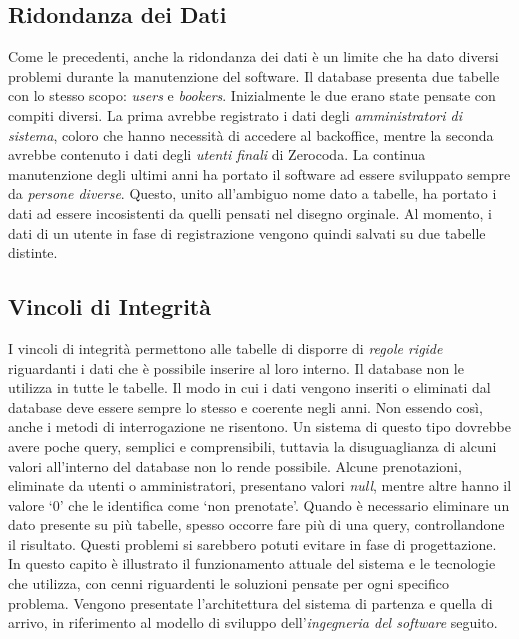 \subsection{Ridondanza dei Dati}
Come le precedenti, anche la ridondanza dei dati è un limite che ha dato diversi problemi durante la manutenzione del software. Il database presenta due tabelle con lo stesso scopo: \textit{users} e \textit{bookers}. Inizialmente le due erano state pensate con compiti diversi. La prima avrebbe registrato i dati degli \emph{amministratori di sistema}, coloro che hanno necessità di accedere al backoffice, mentre la seconda avrebbe contenuto i dati degli \emph{utenti finali} di Zerocoda. La continua manutenzione degli ultimi anni ha portato il software ad essere sviluppato sempre da \textit{persone diverse}. Questo, unito all'ambiguo nome dato a tabelle, ha portato i dati ad essere incosistenti da quelli pensati nel disegno orginale. Al momento, i dati di un utente in fase di registrazione vengono quindi salvati su due tabelle distinte.

\subsection{Vincoli di Integrità}
I vincoli di integrità permettono alle tabelle di disporre di \emph{regole rigide} riguardanti i dati che è possibile inserire al loro interno. Il database non le utilizza in tutte le tabelle. Il modo in cui i dati vengono inseriti o eliminati dal database deve essere sempre lo stesso e coerente negli anni. Non essendo così, anche i metodi di interrogazione ne risentono. Un sistema di questo tipo dovrebbe avere poche query, semplici e comprensibili, tuttavia la disuguaglianza di alcuni valori all'interno del database non lo rende possibile. Alcune prenotazioni, eliminate da utenti o amministratori, presentano valori \emph{null}, mentre altre hanno il valore `0' che le identifica come `non prenotate'. Quando è necessario eliminare un dato presente su più tabelle, spesso occorre fare più di una query, controllandone il risultato. Questi problemi si sarebbero potuti evitare in fase di progettazione.
In questo capito è illustrato il funzionamento attuale del sistema e le tecnologie che utilizza, con cenni riguardenti le soluzioni pensate per ogni specifico problema. Vengono presentate l'architettura del sistema di partenza e quella di arrivo, in riferimento al modello di sviluppo dell'\emph{ingegneria del software} seguito.

